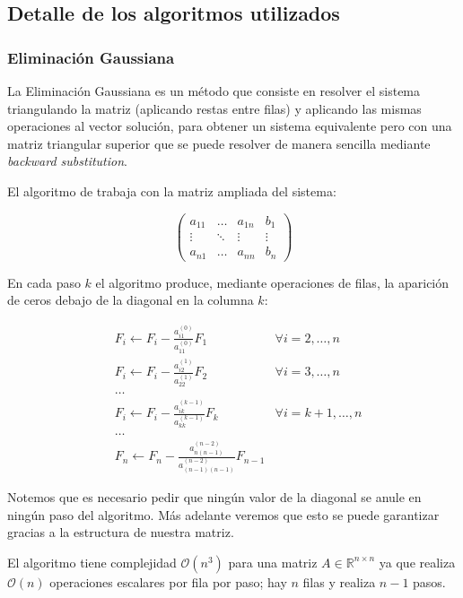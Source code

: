 \subsection{Detalle de los algoritmos utilizados}
\subsubsection{Eliminación Gaussiana}
La Eliminación Gaussiana es un método que consiste en resolver el sistema triangulando la matriz (aplicando restas entre filas) y aplicando las mismas operaciones al vector solución, para obtener un sistema equivalente pero con una matriz triangular superior que se puede resolver de manera sencilla mediante \emph{backward substitution}.

El algoritmo de trabaja con la matriz ampliada del sistema:

\[\left(\begin{array}{ccc|c}
a_{11} & \ldots & a_{1n} & b_1\\
\vdots & \ddots & \vdots & \vdots\\
a_{n1} & \ldots & a_{nn} & b_n
\end{array}\right)\]

En cada paso $k$ el algoritmo produce, mediante operaciones de filas, la aparición de ceros debajo de la diagonal en la columna $k$:

\begin{align*}
&F_i \leftarrow F_i - \frac{a_{i1}^{(0)}}{a_{11}^{(0)}}F_1 &\forall i = 2, \ldots, n \\
&F_i \leftarrow F_i - \frac{a_{i2}^{(1)}}{a_{22}^{(1)}}F_2 &\forall i = 3, \ldots, n \\
&\ldots \\
&F_i \leftarrow F_i - \frac{a_{ik}^{(k - 1)}}{a_{kk}^{(k - 1)}}F_k &\forall i = k + 1, \ldots, n \\
&\ldots \\
&F_n \leftarrow F_n - \frac{a_{n(n-1)}^{(n-2)}}{a_{(n-1)(n-1)}^{(n-2)}}F_{n - 1} &
\end{align*}

Notemos que es necesario pedir que ningún valor de la diagonal se anule en ningún paso del algoritmo. Más adelante veremos que esto se puede garantizar gracias a la estructura de nuestra matriz.

El algoritmo tiene complejidad $\mathcal{O}(n^3)$ para una matriz $A \in \mathbb{R}^{n \times n}$ ya que realiza $\mathcal{O}(n)$ operaciones escalares por fila por paso; hay $n$ filas y realiza $n-1$ pasos.

